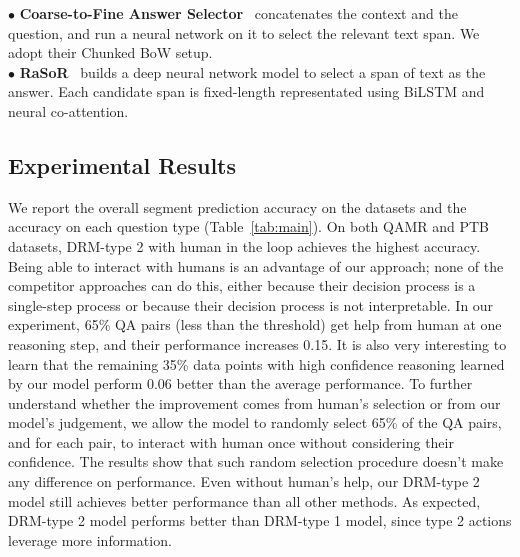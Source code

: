 $\bullet$  \textbf{Coarse-to-Fine Answer Selector}~\cite{DBLP:conf/acl/ChoiHUPLB17} concatenates the context and the question, and run a neural network on it to select the relevant text span. We adopt their Chunked BoW setup.\\
$\bullet$  \textbf{RaSoR}~\cite{DBLP:journals/corr/LeeKP016} builds a deep neural network model to select a span of text as the answer. Each candidate span is fixed-length representated using BiLSTM and neural co-attention. 

\subsection{Experimental Results}




We report the overall segment prediction accuracy on the datasets and the accuracy on each question type (Table~\ref{tab:main}). On both QAMR and PTB datasets, DRM-type 2 with human in the loop achieves the highest accuracy. Being able to interact with humans is an advantage of our approach; 
none of the competitor approaches can do this, either because their decision process is a single-step process or because their decision process is not interpretable. In our experiment, 65\% QA pairs (less than the threshold) get help from human at one reasoning step, and their performance increases 0.15. It is also very interesting to learn that the remaining 35\% data points with high confidence reasoning learned by our model perform 0.06 better than the average performance. To further understand whether the improvement comes from human's selection or from our model's judgement, we allow the model to randomly select 65\% of the QA pairs, and for each pair, to interact with human once without considering their confidence. The results show that such random selection procedure doesn't make any difference on performance. Even without human's help, our DRM-type 2 model still achieves better performance than all other methods. As expected, DRM-type 2 model performs better than DRM-type 1 model, since type 2 actions leverage more information. 

